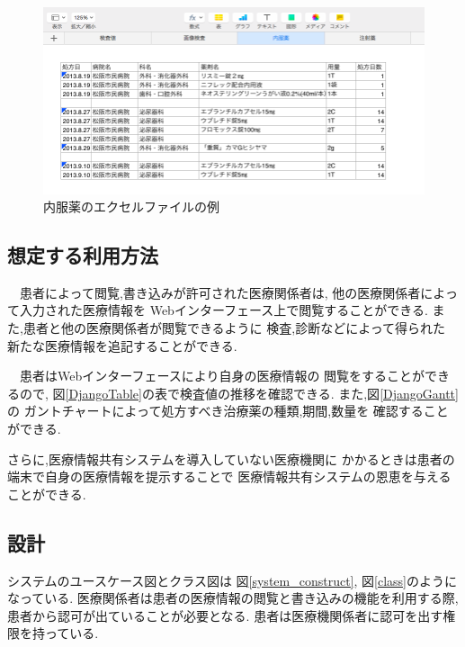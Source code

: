  \begin{figure}[htbp]
    \begin{center}
      \includegraphics[width=13cm, bb=0 0 850 411]{./gazou/excel-data-medicine.png}
    \end{center}
    \caption{内服薬のエクセルファイルの例}
    \label{excel-data-medicine}
  \end{figure}


\subsection{想定する利用方法}
  　患者によって閲覧,書き込みが許可された医療関係者は,
  他の医療関係者によって入力された医療情報を
  Webインターフェース上で閲覧することができる.
  また,患者と他の医療関係者が閲覧できるように
  検査,診断などによって得られた
  新たな医療情報を追記することができる.

  　患者はWebインターフェースにより自身の医療情報の
  閲覧をすることができるので,
  図\ref{DjangoTable}の表で検査値の推移を確認できる.
  また,図\ref{DjangoGantt}の
  ガントチャートによって処方すべき治療薬の種類,期間,数量を
  確認することができる.

  さらに,医療情報共有システムを導入していない医療機関に
  かかるときは患者の端末で自身の医療情報を提示することで
  医療情報共有システムの恩恵を与えることができる.


\subsection{設計}
  システムのユースケース図とクラス図は
  図\ref{system_construct},
  図\ref{class}のようになっている.
  医療関係者は患者の医療情報の閲覧と書き込みの機能を利用する際,
  患者から認可が出ていることが必要となる.
  患者は医療機関係者に認可を出す権限を持っている.

